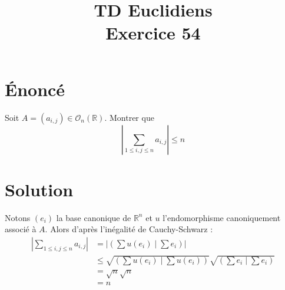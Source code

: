 \documentclass[french]{article}
\title{TD Euclidiens\\ Exercice 54}
\date{}
\newcommand{\R}{\mathbb{R}}
\begin{document}
\maketitle

\section{Énoncé}
Soit $A=(a_{i,j})\in\mathcal{O}_n(\R)$. Montrer que $$\left\lvert\sum_{1\leqslant i,j\leqslant n}a_{i,j}\right\rvert\leqslant n$$
\section{Solution}
Notons $(e_i)$ la base canonique de $\R^n$ et $u$ l'endomorphisme canoniquement associé à $A$. Alors d'après l'inégalité de Cauchy-Schwarz : \begin{align*}
	\left\lvert\sum_{1\leqslant i,j\leqslant n}a_{i,j}\right\rvert&=\left\lvert\left(\sum u(e_i)\mid \sum e_i\right)\right\rvert \\
	&\leqslant\sqrt{\left(\sum u(e_i)\mid \sum u(e_i)\right)}\sqrt{\left(\sum e_i\mid \sum e_i\right)}\\
	&=\sqrt{n}\sqrt{n}\\
	&=n
\end{align*}
\end{document}
